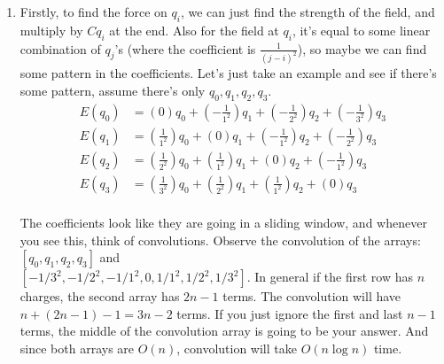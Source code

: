 \documentclass[12pt]{report}
\begin{document}
\begin{enumerate}[label=\textbf{\arabic*.}]
    \item Firstly, to find the force on $q_i$, we can just find the strength of the field, and multiply by $C q_i$ at the end. Also for the field at $q_i$, 
    it's equal to some linear combination of $q_j$'s (where the coefficient is $\frac{1}{(j-i)^2}$), so maybe we can find some pattern in the coefficients.
    Let's just take an example and see if there's some pattern, assume there's only $q_0, q_1, q_2, q_3$.
    \begin{align*}
        E(q_0) &= (0) q_0 + \left(-\frac{1}{1^2}\right) q_1 + \left(-\frac{1}{2^2}\right) q_2 + \left(-\frac{1}{3^2}\right) q_3 \\
        E(q_1) &= \left(\frac{1}{1^2}\right) q_0 + (0) q_1 + \left(-\frac{1}{1^2}\right) q_2 + \left(-\frac{1}{2^2}\right) q_3 \\
        E(q_2) &= \left(\frac{1}{2^2}\right) q_0 + \left(\frac{1}{1^2}\right) q_1 + (0) q_2 + \left(-\frac{1}{1^2}\right) q_3 \\
        E(q_3) &= \left(\frac{1}{3^2}\right) q_0 + \left(\frac{1}{2^2}\right) q_1 + \left(\frac{1}{1^2}\right) q_2 + (0) q_3 \\
    \end{align*}

    The coefficients look like they are going in a sliding window, and whenever you see this, think of convolutions. Observe the convolution
    of the arrays: $[q_0, q_1, q_2, q_3]$ and \\ $[-1/3^2, -1/2^2, -1/1^2, 0, 1/1^2, 1/2^2, 1/3^2]$. In general if the first row has $n$ charges,
    the second array has $2n-1$ terms. The convolution will have $n + (2n-1) - 1 = 3n - 2$ terms. If you just ignore the first and last $n-1$ 
    terms, the middle of the convolution array is going to be your answer. And since both arrays are $O(n)$, convolution will take $O(n \log n)$
    time.
    
\end{enumerate}
\end{document}
